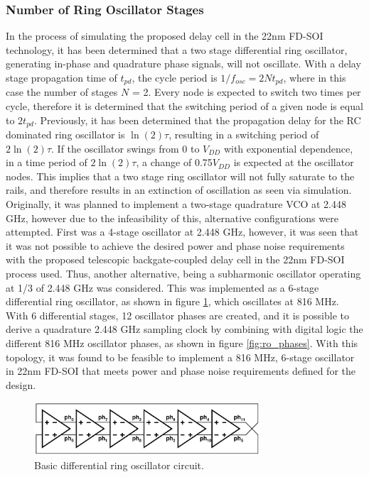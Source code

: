 	\subsubsection{Number of Ring Oscillator Stages}\label{sec:num_stages}
	In the process of simulating the proposed delay cell in the 22nm FD-SOI technology, it has been determined that a two stage differential ring oscillator, generating in-phase and quadrature phase signals, will not oscillate. With a delay stage propagation time of $t_{pd}$, the cycle period is $1/f_{osc} = 2Nt_{pd}$, where in this case the number of stages $N$ = 2. Every node is expected to switch two times per cycle, therefore it is determined that the switching period of a given node is equal to $2t_{pd}$. Previously, it has been determined that the propagation delay for the RC dominated ring oscillator is $\ln(2)\tau$, resulting in a switching period of $2\ln(2)\tau$. If the oscillator swings from 0 to $V_{DD}$ with exponential dependence, in a time period of $2\ln(2)\tau$, a change of 0.75$V_{DD}$ is expected at the oscillator nodes. This implies that a two stage ring oscillator will not fully saturate to the rails, and therefore results in an extinction of oscillation as seen via simulation. Originally, it was planned to implement a two-stage quadrature VCO at 2.448 GHz, however due to the infeasibility of this, alternative configurations were attempted. First was a 4-stage oscillator at 2.448 GHz, however, it was seen that it was not possible to achieve the desired power and phase noise requirements with the proposed telescopic backgate-coupled delay cell in the 22nm FD-SOI process used. Thus, another alternative, being a subharmonic oscillator operating at 1/3 of 2.448 GHz was considered. This was implemented as a 6-stage differential ring oscillator, as shown in figure \ref{fig:basic_6stg_ro}, which oscillates at 816 MHz. With 6 differential stages, 12 oscillator phases are created, and it is possible to derive a quadrature 2.448 GHz sampling clock by combining with digital logic the different 816 MHz oscillator phases, as shown in figure \ref{fig:ro_phases}. With this topology, it was found to be feasible to implement a 816 MHz, 6-stage oscillator in 22nm FD-SOI that meets power and phase noise requirements defined for the design.


			\begin{figure}[htb!]
			        \centering
			        \includegraphics[width=0.75\textwidth, angle=0]{./figs/design/ro_6st_simple}
			    \caption{Basic differential ring oscillator circuit.}
			    \label{fig:basic_6stg_ro}
			\end{figure}



